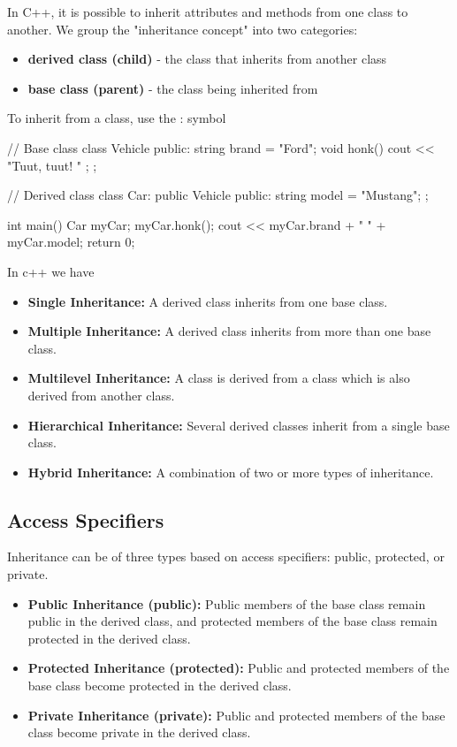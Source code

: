 \documentclass{report}
\begin{document}
    \pagebreak
    \bigbreak \noindent 
    \begin{concept}
       In C++, it is possible to inherit attributes and methods from one class to another. We group the "inheritance concept" into two categories:
       \begin{itemize}
           \item \textbf{derived class (child)} - the class that inherits from another class
           \item \textbf{base class (parent)} - the class being inherited from
       \end{itemize}
       To inherit from a class, use the : symbol
    \end{concept}
    \bigbreak \noindent 
    \begin{cppcode}
// Base class
class Vehicle {
  public:
    string brand = "Ford";
    void honk() {
      cout << "Tuut, tuut! \n" ;
    }
};

// Derived class
class Car: public Vehicle {
  public:
    string model = "Mustang";
};

int main() {
  Car myCar;
  myCar.honk();
  cout << myCar.brand + " " + myCar.model;
  return 0;
}
    \end{cppcode}
    \bigbreak \noindent 
    In c++ we have
    \begin{itemize}
        \item \textbf{Single Inheritance:} A derived class inherits from one base class.
        \item \textbf{Multiple Inheritance:} A derived class inherits from more than one base class.
        \item \textbf{Multilevel Inheritance:} A class is derived from a class which is also derived from another class.
        \item \textbf{Hierarchical Inheritance:} Several derived classes inherit from a single base class.
        \item \textbf{Hybrid Inheritance:} A combination of two or more types of inheritance.
    \end{itemize}

    \pagebreak 
    \subsection{Access Specifiers}
    \bigbreak \noindent 
    Inheritance can be of three types based on access specifiers: public, protected, or private.
    \begin{itemize}
        \item \textbf{Public Inheritance (public):} Public members of the base class remain public in the derived class, and protected members of the base class remain protected in the derived class.
        \item \textbf{Protected Inheritance (protected):} Public and protected members of the base class become protected in the derived class.
        \item \textbf{Private Inheritance (private):} Public and protected members of the base class become private in the derived class.
    \end{itemize}
\end{document}
